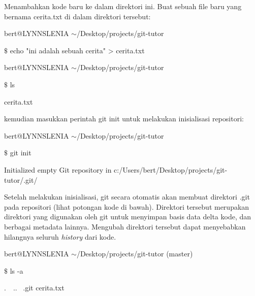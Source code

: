 \vspace{10pt}
Menambahkan kode baru ke dalam direktori ini. Buat sebuah file baru yang bernama cerita.txt di dalam direktori tersebut: \par
\noindent 
{\fontsize{10pt}{10pt}\selectfont bert@LYNNSLENIA  $  \sim  $/Desktop/projects/git-tutor} \par
\noindent 
{\fontsize{10pt}{10pt}\selectfont  $  \$  $ echo "ini adalah sebuah cerita" > cerita.txt} \par
\noindent 
\vspace{10pt}
\noindent 
{\fontsize{10pt}{10pt}\selectfont bert@LYNNSLENIA  $  \sim  $/Desktop/projects/git-tutor} \par
\noindent 
{\fontsize{10pt}{10pt}\selectfont  $  \$  $ ls} \par
\noindent 
{\fontsize{10pt}{10pt}\selectfont cerita.txt} \par
\vspace{12pt}
\noindent 
kemudian masukkan perintah git init untuk melakukan inisialisasi repositori: \par
\noindent 
{\fontsize{10pt}{10pt}\selectfont bert@LYNNSLENIA  $  \sim  $/Desktop/projects/git-tutor} \par
\noindent 
{\fontsize{10pt}{10pt}\selectfont  $  \$  $ git init} \par
\noindent 
{\fontsize{10pt}{10pt}\selectfont Initialized empty Git repository in c:/Users/bert/Desktop/projects/git-tutor/.git/} \par
\vspace{12pt}
Setelah melakukan inisialisasi, git secara otomatis akan membuat direktori .git pada repositori  (lihat potongan kode di bawah). Direktori tersebut merupakan direktori yang digunakan oleh git untuk menyimpan basis data delta kode, dan berbagai metadata lainnya. Mengubah direktori tersebut dapat menyebabkan hilangnya seluruh \emph{history} dari kode. \par
\noindent 
{\fontsize{10pt}{10pt}\selectfont bert@LYNNSLENIA  $  \sim  $/Desktop/projects/git-tutor (master)} \par
\noindent 
{\fontsize{10pt}{10pt}\selectfont  $  \$  $ ls -a} \par
\noindent 
{\fontsize{10pt}{10pt}\selectfont .~~..~ .git  cerita.txt} \par
\vspace{10pt}
\vspace{10pt}
\vspace{10pt}
\vspace{10pt}
\vspace{10pt}
